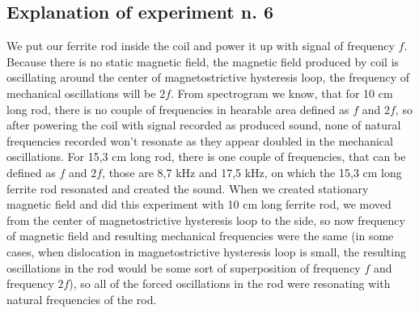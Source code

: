 \documentclass[10pt,a4paper]{article}
\begin{document}
\subsection{Explanation of experiment n. 6}
We put our ferrite rod inside the coil and power it up with signal of frequency $f$. Because there is no static magnetic field, the magnetic field produced by coil is oscillating around the center of magnetostrictive hysteresis loop, the frequency of mechanical oscillations will be $2f$. From spectrogram we know, that for 10 cm long rod, there is no couple of frequencies in hearable area defined as $f$ and $2f$, so after powering the coil with signal recorded as produced sound, none of natural frequencies recorded won't resonate as they appear doubled in the mechanical oscillations. For 15,3 cm long rod, there is one couple of frequencies, that can be defined as $f$ and $2f$, those are 8,7 kHz and 17,5 kHz, on which the 15,3 cm long ferrite rod resonated and created the sound. When we created stationary magnetic field and did this experiment with 10 cm long ferrite rod, we moved from the center of magnetostrictive hysteresis loop to the side, so now frequency of magnetic field and resulting mechanical frequencies were the same (in some cases, when dislocation in magnetostrictive hysteresis loop is small, the resulting oscillations in the rod would be some sort of superposition of frequency $f$ and frequency $2f$), so all of the forced oscillations in the rod were resonating with natural frequencies of the rod.

\newpage
\end{document}
